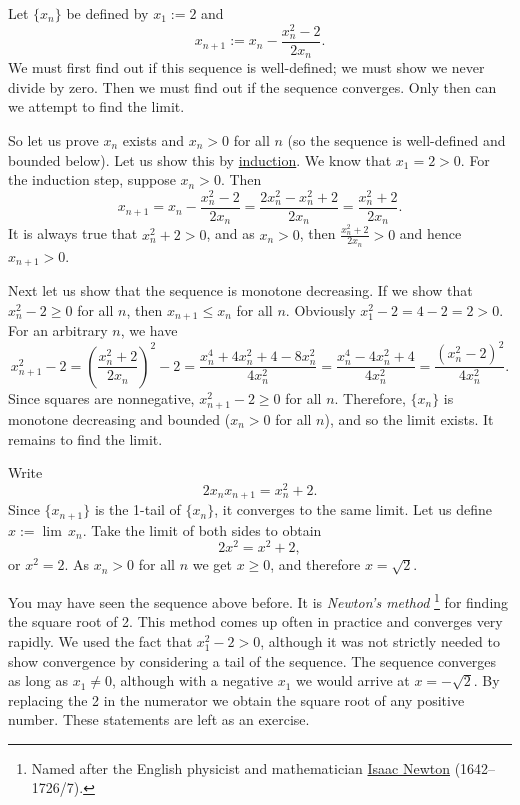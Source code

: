 \begin{example}
Let $\{ x_n \}$ be defined by $x_1 := 2$ and
\begin{equation*}
x_{n+1} := x_n - \frac{x_n^2-2}{2x_n} .
\end{equation*}
We must first find out if this sequence is well-defined; we must show we never
divide by zero.
Then we must find out if the sequence converges.  Only then
can we attempt to find the limit.

So let us prove 
$x_n$ exists and $x_n > 0$ for all $n$ (so the sequence is well-defined
and bounded below).
Let us show this by \hyperref[induction:thm]{induction}.  We know that
$x_1 = 2 > 0$.  For the induction step, suppose $x_n > 0$.  Then
\begin{equation*}
x_{n+1} = x_n - \frac{x_n^2-2}{2x_n} =
\frac{2x_n^2 - x_n^2+2}{2x_n} =
\frac{x_n^2+2}{2x_n} .
\end{equation*}
It is always true that $x_n^2+2 > 0$,
and as
$x_n > 0$, then $\frac{x_n^2+2}{2x_n} > 0$ and hence $x_{n+1} > 0$.

Next let us
show that the sequence is monotone decreasing.  If we show that
$x_n^2-2 \geq 0$ for all $n$, then $x_{n+1} \leq x_n$ for all $n$.
Obviously $x_1^2-2 = 4-2 = 2 > 0$.  For an arbitrary $n$, we have 
\begin{equation*}
x_{n+1}^2-2 =
{\left( \frac{x_n^2+2}{2x_n} \right)}^2 - 2
=
\frac{x_n^4+4x_n^2+4 - 8x_n^2}{4x_n^2}
=
\frac{x_n^4-4x_n^2+4}{4x_n^2}
=
\frac{{\left( x_n^2-2 \right)}^2}{4x_n^2} .
\end{equation*}
Since squares are nonnegative,
$x_{n+1}^2-2 \geq 0$ for all $n$.  Therefore,
$\{ x_n \}$ is monotone decreasing and bounded ($x_n > 0$ for all $n$), and 
so the limit exists.  It remains to find the limit.

Write
\begin{equation*}
2x_nx_{n+1} = x_n^2+2 .
\end{equation*}
Since $\{ x_{n+1} \}$ is the 1-tail of $\{ x_n \}$, it converges to the
same limit.  Let us define $x := \lim\, x_n$.  Take the limit of
both sides to obtain
\begin{equation*}
2x^2 = x^2+2 ,
\end{equation*}
or $x^2 = 2$.  As $x_n > 0$ for all $n$ we get $x \geq 0$, and therefore $x = \sqrt{2}$.
\end{example}

You may have seen the sequence above before.  It is
\emph{Newton's method}%
\footnote{%
Named after the English physicist and mathematician
\href{https://en.wikipedia.org/wiki/Isaac_Newton}{Isaac Newton}
(1642--1726/7).}
for finding the square root of 2.  This method comes up often in
practice and converges very rapidly.  We used the fact that
$x_1^2 -2 >0$, although it was not strictly needed to show convergence by
considering a tail of the sequence.
The sequence converges as long as $x_1 \not= 0$, although with a negative $x_1$
we would arrive at $x=-\sqrt{2}$.  By replacing the 2 in the numerator we 
obtain the square root of any positive number.  These statements are left as
an exercise.

